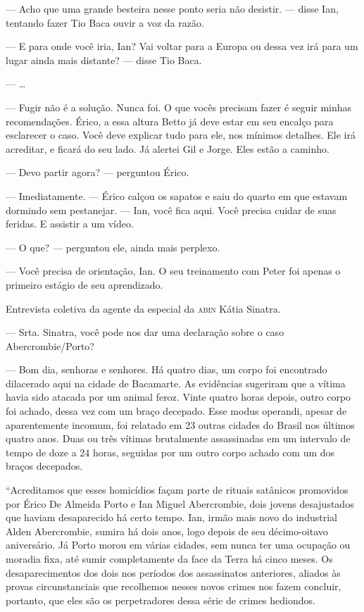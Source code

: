 --- Acho que uma grande besteira nesse ponto seria não desistir. ---
disse Ian, tentando fazer Tio Baca ouvir a voz da razão.

--- E para onde você iria, Ian? Vai voltar para a Europa ou dessa vez
irá para um lugar ainda mais distante? --- disse Tio Baca.

--- \ldots

--- Fugir não é a solução. Nunca foi. O que vocês precisam fazer é
seguir minhas recomendações. Érico, a essa altura Betto já deve estar em
seu encalço para esclarecer o caso. Você deve explicar tudo para ele,
nos mínimos detalhes. Ele irá acreditar, e ficará do seu lado. Já
alertei Gil e Jorge. Eles estão a caminho.

--- Devo partir agora? --- perguntou Érico.

--- Imediatamente. --- Érico calçou os sapatos e saiu do quarto em que
estavam dormindo sem pestanejar. --- Ian, você fica aqui. Você precisa
cuidar de suas feridas. E assistir a um vídeo.

--- O que? --- perguntou ele, ainda mais perplexo.

--- Você precisa de orientação, Ian. O seu treinamento com Peter foi
apenas o primeiro estágio de seu aprendizado.


Entrevista coletiva da agente da especial da \textsc{abin} Kátia
Sinatra.

--- Srta. Sinatra, você pode nos dar uma declaração sobre o caso
Abercrombie/Porto?

--- Bom dia, senhoras e senhores. Há quatro dias, um corpo foi
encontrado dilacerado aqui na cidade de Bacamarte. As evidências
sugeriram que a vítima havia sido atacada por um animal feroz. Vinte
quatro horas depois, outro corpo foi achado, dessa vez com um braço
decepado. Esse modus operandi, apesar de aparentemente incomum, foi
relatado em 23 outras cidades do Brasil nos últimos quatro anos. Duas ou
três vítimas brutalmente assassinadas em um intervalo de tempo de doze a
24 horas, seguidas por um outro corpo achado com um dos braços
decepados.

“Acreditamos que esses homicídios façam parte de rituais satânicos
promovidos por Érico De Almeida Porto e Ian Miguel Abercrombie, dois
jovens desajustados que haviam desaparecido há certo tempo. Ian, irmão
mais novo do industrial Alden Abercrombie, sumira há dois anos, logo
depois de seu décimo-oitavo aniversário. Já Porto morou em várias
cidades, sem nunca ter uma ocupação ou moradia fixa, até sumir
completamente da face da Terra há cinco meses. Os desaparecimentos dos
dois nos períodos dos assassinatos anteriores, aliados às provas
circunstanciais que recolhemos nesses novos crimes nos fazem concluir,
portanto, que eles são os perpetradores dessa série de crimes hediondos.

